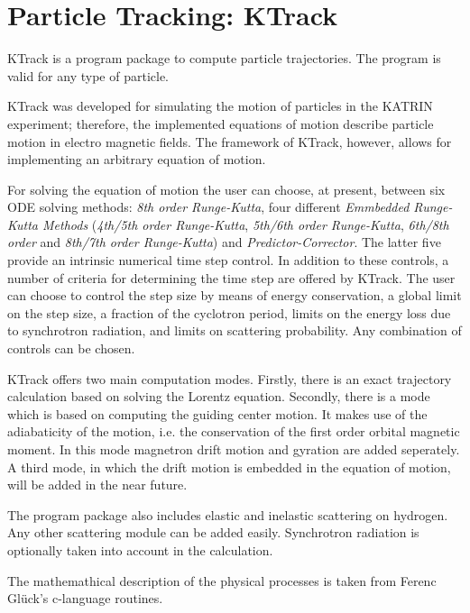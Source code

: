 \setcounter{secnumdepth}{4}
\section{Particle Tracking: KTrack}\label{sec:KTrack}

KTrack is a program package to compute particle trajectories. The program is valid for any type of particle.

KTrack was developed for simulating the motion of particles in the KATRIN experiment; therefore, the implemented equations of motion describe particle motion in electro magnetic fields. The framework of KTrack, however, allows for implementing an arbitrary equation of motion. 

For solving the equation of motion the user can choose, at present, between six ODE solving methods: \textit{8th order Runge-Kutta}, four different \textit{Emmbedded Runge-Kutta Methods} (\textit{4th/5th order Runge-Kutta}, \textit{5th/6th order Runge-Kutta}, \textit{6th/8th order} and \textit{8th/7th order Runge-Kutta}) and \textit{Predictor-Corrector}. The latter five provide an intrinsic numerical time step control. In addition to these controls, a number of criteria for determining the time step are offered by KTrack. The user can choose to control the step size by means of energy conservation, a global limit on the step size, a fraction of the cyclotron period, limits on the energy loss due to synchrotron radiation, and limits on scattering probability. Any combination of controls can be chosen.

KTrack offers two main computation modes. Firstly, there is an exact trajectory calculation based on solving the Lorentz equation. Secondly, there is a mode which is based on computing the guiding center motion. It makes use of the adiabaticity of the motion, i.e. the conservation of the first order orbital magnetic moment. In this mode magnetron drift motion and gyration are added seperately. A third mode, in which the drift motion is embedded in the equation of motion, will be added in the near future. 
 
The program package also includes elastic and inelastic scattering on hydrogen. Any other scattering module can be added easily. Synchrotron radiation is optionally taken into account in the calculation.

The mathemathical description of the physical processes is taken from Ferenc Gl\"uck's c-language routines.


